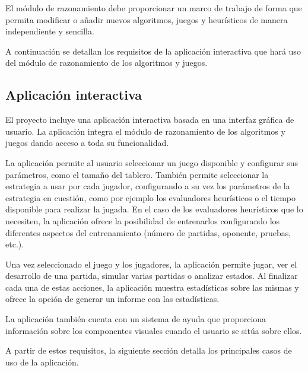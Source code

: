 El módulo de razonamiento debe proporcionar un marco de trabajo de forma que permita modificar o añadir nuevos algoritmos, juegos y heurísticos de manera independiente y sencilla.

\bigskip
A continuación se detallan los requisitos de la aplicación interactiva que hará uso del módulo de razonamiento de los algoritmos y juegos.

\subsection{Aplicación interactiva}
\label{ssec:aplicacion_interactiva}
El proyecto incluye una aplicación interactiva basada en una interfaz gráfica de usuario. 
La aplicación integra el módulo de razonamiento de los algoritmos y juegos dando acceso a toda su funcionalidad.

La aplicación permite al usuario seleccionar un juego disponible y configurar sus parámetros, como el tamaño del tablero.
También permite seleccionar la estrategia a usar por cada jugador, configurando a su vez los parámetros de la estrategia en cuestión, como por ejemplo los evaluadores heurísticos o el tiempo disponible para realizar la jugada.
En el caso de los evaluadores heurísticos que lo necesiten, la aplicación ofrece la posibilidad de entrenarlos configurando los diferentes aspectos del entrenamiento (número de partidas, oponente, pruebas, etc.).

Una vez seleccionado el juego y los jugadores, la aplicación permite jugar, ver el desarrollo de una partida, simular varias partidas o analizar estados.
Al finalizar cada una de estas acciones, la aplicación muestra estadísticas sobre las mismas y ofrece la opción de generar un informe con las estadísticas.

La aplicación también cuenta con un sistema de ayuda que proporciona información sobre los componentes visuales cuando el usuario se sitúa sobre ellos.

\bigskip
A partir de estos requisitos, la siguiente sección detalla los principales casos de uso de la aplicación.

